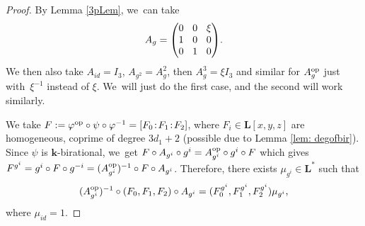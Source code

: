 \documentclass[JEP,XML,SOM,Unicode,NoFloatCountersInSection, NoEqCountersInSection,published]{cedram}
\newcommand{\op}{\textup{op}}
\newcommand{\sep}{\mkern2mu{:}\mkern2mu}
\theoremstyle{definition}
\newcommand{\kk}{{\boldsymbol{k}}}
\newcommand{\LL}{{\boldsymbol{L}}}
\begin{document}
\begin{proof}
By Lemma \ref{3pLem}, we~can take
\[\arraycolsep4.5pt
A_g =
\begin{pmatrix}
0 & 0 & \xi \\
1 & 0 & 0 \\
0 & 1 & 0
\end{pmatrix}\!.
\]
We then also take $A_{id} = I_3$, $A_{g^2} = A_g^2$, then $A_g^3 = \xi I_3$ and similar for $A_g^{\op}$ just with~$\xi^{-1}$ instead of $\xi$. We~will just do the first case, and the second will work similarly.

We take $F := \varphi^{\op} \circ \psi \circ \varphi^{-1} = [F_0\sep F_1\sep F_2]$, where $F_i \in \LL[x,y,z]$ are homogeneous, coprime of degree $3d_1 + 2$ (possible due to Lemma \ref{lem: degofbir}). Since $\psi$ is $\kk$-birational, we~get $F \circ A_{g^i} \circ g^i = A_{g^i}^{\op} \circ g^i \circ F$ which gives $F^{g^i} = g^{i} \circ F \circ g^{-i} = (A_{g^{i}}^{\op})^{-1} \circ F \circ A_{g^{i}}$. Therefore, there exists $\mu_{g^{i}} \in \LL^*$ such that
\[
(A_{g^{i}}^{\op})^{-1} \circ (F_0, F_1, F_2) \circ A_{g^{i}} = (F_0^{g^{i}},F_1^{g^{i}},F_2^{g^{i}})\mu_{g^{i}},
\]
where $\mu_{id} = 1$.


\end{proof}
\end{document}
